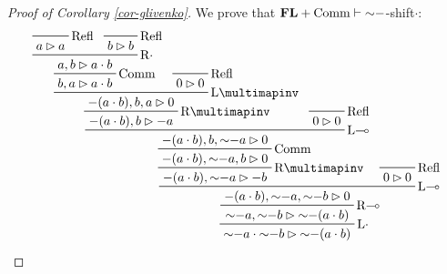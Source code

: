 \documentclass[runningheads]{llncs}
\newcommand{\FL}{\mathbf{FL}}
\begin{document}
\begin{proof}[Proof of Corollary \ref{cor-glivenko}]
	We prove that $\FL+\textnormal{Comm}\vdash{\sim}{-}$-shift$\cdot$:
	\[
	\prftree[r]{\textnormal{L$\cdot$}}{
		\prftree[r]{\textnormal{R$\multimap$}}{
			\prftree[r]{\textnormal{L$\multimap$}}{
				\prftree[r]{\textnormal{R$\multimapinv$}}{
					\prftree[r]{\textnormal{Comm}}{
					\prftree[r]{\textnormal{L$\multimap$}}{
						\prftree[r]{\textnormal{R$\multimapinv$}}{
							\prftree[r]{\textnormal{L$\multimapinv$}}{
							\prftree[r]{\textnormal{Comm}}{
								\prftree[r]{\textnormal{R$\cdot$}}{
									\prftree[r]{Refl}{a\rhd a}
								}{
									\prftree[r]{Refl}{b\rhd b}
								}{a,b\rhd a\cdot b}
								}{b,a\rhd a\cdot b}
							}{
								\prftree[r]{\textnormal{Refl}}{0\rhd 0}
							}{{-}(a\cdot b),b,a\rhd 0}
						}{{-}(a\cdot b),b\rhd {-}a}
					}{
						\prftree[r]{\textnormal{Refl}}{0\rhd 0}
                    }{{-}(a\cdot b),b, {\sim}{-}a\rhd 0}
					}{{-}(a\cdot b), {\sim}{-}a,b\rhd 0}
				}{{-}(a\cdot b), {\sim}{-}a\rhd {-}b}
			}{
				\prftree[r]{\textnormal{Refl}}{0\rhd 0}
			}{{-}(a\cdot b),{\sim}{-}a, {\sim}{-}b\rhd 0}
		}{{\sim}{-}a, {\sim}{-}b\rhd {\sim}{-}(a\cdot b)}
	}{{\sim}{-}a\cdot {\sim}{-}b\rhd {\sim}{-}(a\cdot b)}
	\qedhere
	\]
\end{proof}
\end{document}
